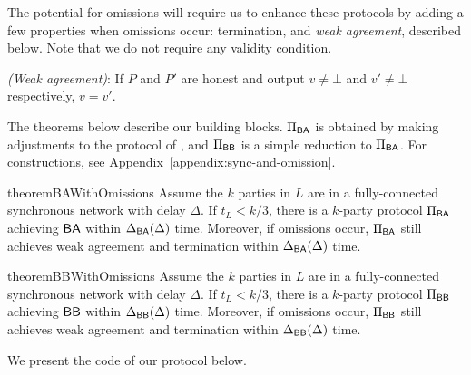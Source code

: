 The potential for omissions will require us to enhance these protocols by adding a few properties when omissions occur: termination, and \emph{weak agreement}, described below. Note that we do not require any validity condition.

\vspace{0.1cm}
\noindent \emph{(Weak agreement)}: If $P$ and $P'$ are honest and output $v \neq \bot$ and $v' \neq \bot$ respectively, $v = v'$.
\vspace{0.1cm}


The theorems below describe our building blocks. $\Pi_{\textsf{BA}}$ is obtained by making adjustments to the protocol of \cite{King}, and $\Pi_{\textsf{BB}}$ is a simple reduction to $\Pi_{\textsf{BA}}$. For constructions, see Appendix~\ref{appendix:sync-and-omission}. 
\begin{restatable}{theorem}{BAWithOmissions}\label{thm:ba-omissions}
    Assume the $k$ parties in $L$ are in a fully-connected synchronous network with delay $\Delta$. If $t_L < k/3$, there is a $k$-party protocol $\Pi_{\textsf{BA}}$ achieving $\textsf{BA}$ within $\Delta_{\textsf{BA}}( \Delta)$ time. Moreover, if omissions occur, $\Pi_{\textsf{BA}}$ still achieves weak agreement and termination within $\Delta_{\textsf{BA}}(\Delta)$ time.
\end{restatable}
\begin{restatable}{theorem}{BBWithOmissions}\label{thm:bb-omissions}
Assume the $k$ parties in $L$ are in a fully-connected synchronous network with delay $\Delta$. If $t_L < k/3$, there is a $k$-party protocol $\Pi_{\textsf{BB}}$ achieving $\textsf{BB}$ within $\Delta_{\textsf{BB}}(\Delta)$ time. Moreover, if omissions occur, $\Pi_{\textsf{BB}}$ still achieves weak agreement and termination within $\Delta_{\textsf{BB}}(\Delta)$ time.
\end{restatable}

We present the code of our protocol below.

